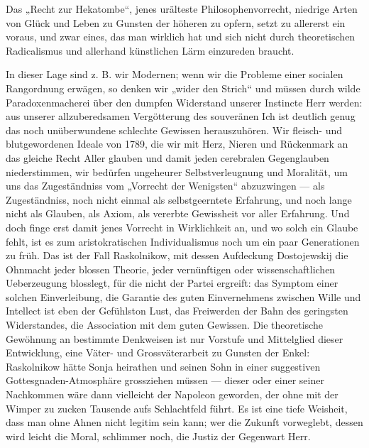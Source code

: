 Das „Recht zur Hekatombe“, jenes urälteste Philosophenvorrecht, niedrige Arten von Glück und Leben zu Gunsten der höheren zu opfern, setzt zu allererst ein  voraus, und zwar eines, das man wirklich hat und sich nicht durch theoretischen Radicalismus und allerhand künstlichen Lärm einzureden braucht.
\par

In dieser Lage sind z. B. wir Modernen; wenn wir die Probleme einer socialen Rangordnung erwägen, so denken wir „wider den Strich“ und müssen durch wilde Paradoxenmacherei über den dumpfen Widerstand unserer Instincte Herr werden: aus unserer allzuberedsamen Vergötterung des souveränen Ich ist deutlich genug das noch unüberwundene schlechte Gewissen herauszuhören. Wir fleisch- und blutgewordenen Ideale von 1789, die wir mit Herz, Nieren und Rückenmark an das gleiche Recht Aller glauben und damit jeden cerebralen Gegenglauben niederstimmen, wir bedürfen ungeheurer Selbstverleugnung und Moralität, um uns das Zugeständniss vom „Vorrecht der Wenigsten“ abzuzwingen — als Zugeständniss, noch nicht einmal als selbstgeerntete Erfahrung, und noch lange nicht als Glauben, als Axiom, als vererbte Gewissheit vor aller Erfahrung. Und doch finge erst damit jenes Vorrecht in Wirklichkeit an, und wo solch ein Glaube fehlt, ist es zum aristokratischen Individualismus noch um ein paar Generationen zu früh. Das ist der Fall Raskolnikow, mit dessen Aufdeckung Dostojewskij die Ohnmacht jeder blossen Theorie, jeder vernünftigen oder wissenschaftlichen Ueberzeugung blosslegt, für die nicht der  Partei ergreift: das Symptom einer solchen Einverleibung, die Garantie des guten Einvernehmens zwischen Wille und Intellect ist eben der Gefühlston Lust, das Freiwerden der Bahn des geringsten Widerstandes, die Association mit dem guten Gewissen. Die theoretische Gewöhnung an bestimmte Denkweisen ist nur Vorstufe und Mittelglied dieser Entwicklung, eine Väter- und Grossväterarbeit zu Gunsten der Enkel: Raskolnikow hätte Sonja heirathen und seinen Sohn in einer suggestiven Gottesgnaden-Atmosphäre grossziehen müssen — dieser oder einer seiner Nachkommen wäre dann vielleicht der Napoleon geworden, der ohne mit der Wimper zu zucken Tausende aufs Schlachtfeld führt. Es ist eine tiefe Weisheit, dass man ohne Ahnen nicht legitim sein kann; wer die Zukunft vorweglebt, dessen wird leicht die Moral, schlimmer noch, die Justiz der Gegenwart Herr.
\par

